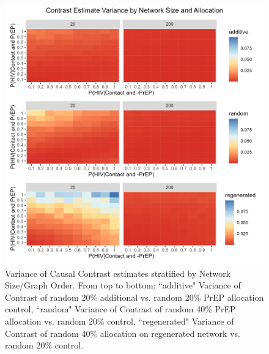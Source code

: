 \documentclass{article}
\theoremstyle{definition}
\begin{document}
\begin{figure}[H]
    \centering
    \includegraphics[scale=0.8]{Figures/Network Size Variance plots.png}
    \caption{Variance of Causal Contrast estimates stratified by Network Size/Graph Order. From top to bottom: ``additive" Variance of Contrast of random 20\% additional vs. random 20\% PrEP allocation control, ``random" Variance of Contrast of random 40\% PrEP allocation vs. random 20\% control, ``regenerated" Variance of Contrast of random 40\% allocation on regenerated network vs. random 20\% control.}
    \label{fig:Figure 8}
\end{figure}
\end{document}
